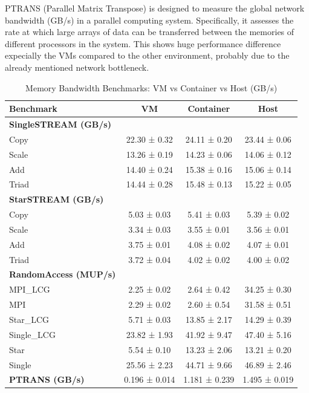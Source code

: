 PTRANS (Parallel Matrix Transpose) is designed to measure the global network bandwidth (GB/s) in a parallel computing system. Specifically, it assesses the rate at which large arrays of data can be transferred between the memories of different processors in the system.
This shows huge performance difference expecially the VMs compared to the other environment, probably due to the already mentioned network bottleneck.



\begin{table}[H]
\centering
\renewcommand{\arraystretch}{1.2}
\begin{tabular}{lccc}
\toprule
\textbf{Benchmark} & \textbf{VM} & \textbf{Container} & \textbf{Host} \\
\midrule
\textbf{SingleSTREAM (GB/s)} & & & \\
Copy   & 22.30 ± 0.32 & 24.11 ± 0.20 & 23.44 ± 0.06 \\
Scale  & 13.26 ± 0.19 & 14.23 ± 0.06 & 14.06 ± 0.12 \\
Add    & 14.40 ± 0.24 & 15.38 ± 0.16 & 15.06 ± 0.14 \\
Triad  & 14.44 ± 0.28 & 15.48 ± 0.13 & 15.22 ± 0.05 \\
\midrule
\textbf{StarSTREAM (GB/s)} & & & \\
Copy   & 5.03 ± 0.03 & 5.41 ± 0.03 & 5.39 ± 0.02 \\
Scale  & 3.34 ± 0.03 & 3.55 ± 0.01 & 3.56 ± 0.01 \\
Add    & 3.75 ± 0.01 & 4.08 ± 0.02 & 4.07 ± 0.01 \\
Triad  & 3.72 ± 0.04 & 4.02 ± 0.02 & 4.00 ± 0.02 \\
\midrule
\textbf{RandomAccess (MUP/s)} & & & \\
MPI\_LCG     & 2.25 ± 0.02 & 2.64 ± 0.42 & 34.25 ± 0.30 \\
MPI          & 2.29 ± 0.02 & 2.60 ± 0.54 & 31.58 ± 0.51 \\
Star\_LCG    & 5.71 ± 0.03 & 13.85 ± 2.17 & 14.29 ± 0.39 \\
Single\_LCG  & 23.82 ± 1.93 & 41.92 ± 9.47 & 47.40 ± 5.16 \\
Star         & 5.54 ± 0.10 & 13.23 ± 2.06 & 13.21 ± 0.20 \\
Single       & 25.56 ± 2.23 & 44.71 ± 9.66 & 46.89 ± 2.46 \\
\midrule
\textbf{PTRANS (GB/s)} & 0.196 ± 0.014 & 1.181 ± 0.239 & 1.495 ± 0.019 \\
\bottomrule
\end{tabular}
\caption{Memory Bandwidth Benchmarks: VM vs Container vs Host (GB/s)}
\end{table}

